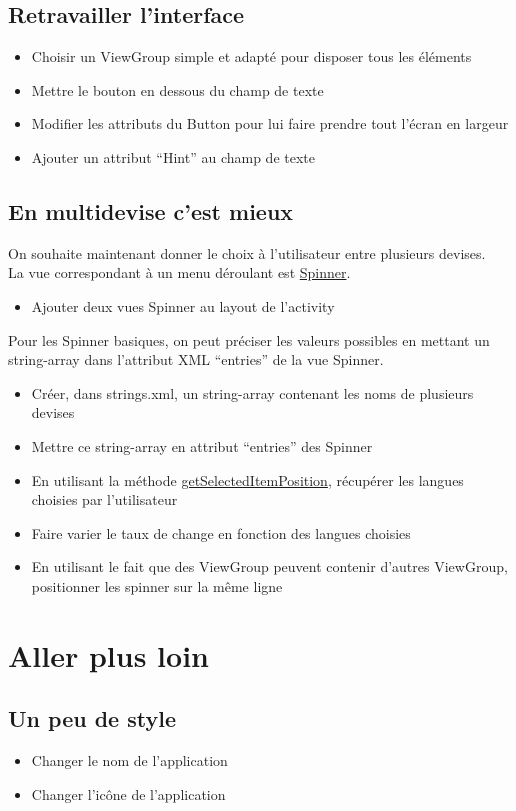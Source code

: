 \documentclass{article}
\begin{document}
\subsection{Retravailler l'interface}
\begin{itemize}
\item Choisir un ViewGroup simple et adapté pour disposer tous les éléments
\item Mettre le bouton en dessous du champ de texte
\item Modifier les attributs du Button pour lui faire prendre tout l'écran en
largeur
\item Ajouter un attribut ``Hint'' au champ de texte
\end{itemize}
\subsection{En multidevise c'est mieux}
On souhaite maintenant donner le choix à l'utilisateur entre plusieurs
devises.\\
La vue correspondant à un menu déroulant est
\href{http://developer.android.com/guide/topics/ui/controls/spinner.html}{Spinner}.
\begin{itemize}
\item Ajouter deux vues Spinner au layout de l'activity
\end{itemize}
Pour les Spinner basiques, on peut préciser les valeurs possibles en
mettant un string-array dans l'attribut XML ``entries'' de la vue Spinner.
\begin{itemize}
\item Créer, dans strings.xml, un string-array contenant les noms de plusieurs
devises
\item Mettre ce string-array en attribut ``entries'' des Spinner
\item En utilisant la méthode
\href{http://developer.android.com/reference/android/widget/AdapterView.html#getSelectedItemPosition()}{getSelectedItemPosition}, récupérer les langues choisies par l'utilisateur
\item Faire varier le taux de change en fonction des langues choisies
\item En utilisant le fait que des ViewGroup peuvent contenir d'autres
ViewGroup, positionner les spinner sur la même ligne
\end{itemize}
\section{Aller plus loin}
\subsection{Un peu de style}
\begin{itemize}
\item Changer le nom de l'application
\item Changer l'icône de l'application
\end{itemize}
\end{document}

